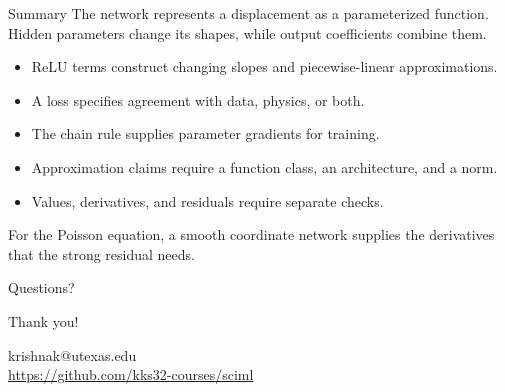 \documentclass[aspectratio=169]{beamer}
\begin{document}
\begin{frame}{Summary}
The network represents a displacement as a parameterized function.
Hidden parameters change its shapes, while output coefficients combine them.
\begin{itemize}
\item ReLU terms construct changing slopes and piecewise-linear approximations.
\item A loss specifies agreement with data, physics, or both.
\item The chain rule supplies parameter gradients for training.
\item Approximation claims require a function class, an architecture, and a norm.
\item Values, derivatives, and residuals require separate checks.
\end{itemize}
For the Poisson equation, a smooth coordinate network supplies the derivatives that the strong residual needs.
\end{frame}

\begin{frame}
\begin{center}
\Huge{Questions?}

\vspace{1cm}

\large{Thank you!}

\vspace{1cm}

\normalsize{
krishnak@utexas.edu \\
\url{https://github.com/kks32-courses/sciml}
}
\end{center}
\end{frame}
\end{document}
